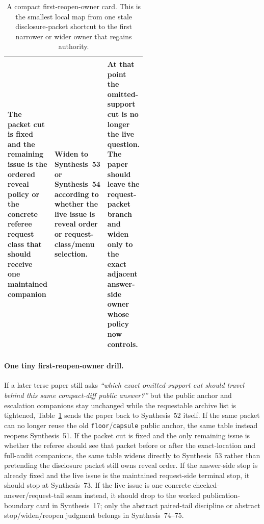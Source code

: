 \documentclass[11pt]{article}
\begin{document}
\begin{table}[t]
\begin{tabularx}{\linewidth}{@{}p{0.31\linewidth}p{0.23\linewidth}X@{}}
The packet cut is fixed and the remaining issue is the ordered reveal policy or the concrete referee request class that should receive one maintained companion & Widen to Synthesis~53 or Synthesis~54 according to whether the live issue is reveal order or request-class/menu selection. & At that point the omitted-support cut is no longer the live question. The paper should leave the request-packet branch and widen only to the exact adjacent answer-side owner whose policy now controls. \\
\bottomrule
\end{tabularx}
\caption{A compact first-reopen-owner card. This is the smallest local map from one stale disclosure-packet shortcut to the first narrower or wider owner that regains authority.}
\label{tab:first-reopen-owner-card-answer-disclosure-packet}
\end{table}

\paragraph{One tiny first-reopen-owner drill.}
If a later terse paper still asks \emph{``which exact omitted-support cut should travel behind this same compact-diff public answer?''} but the public anchor and escalation companions stay unchanged while the requestable archive list is tightened, Table~\ref{tab:first-reopen-owner-card-answer-disclosure-packet} sends the paper back to Synthesis~52 itself. If the same packet can no longer reuse the old \nolinkurl{floor}/\nolinkurl{capsule} public anchor, the same table instead reopens Synthesis~51. If the packet cut is fixed and the only remaining issue is whether the referee should see that packet before or after the exact-location and full-audit companions, the same table widens directly to Synthesis~53 rather than pretending the disclosure packet still owns reveal order. If the answer-side stop is already fixed and the live issue is the maintained request-side terminal stop, it should stop at Synthesis~73. If the live issue is one concrete checked-answer/request-tail seam instead, it should drop to the worked publication-boundary card in Synthesis~17; only the abstract paired-tail discipline or abstract stop/widen/reopen judgment belongs in Synthesis~74--75.\cite{series:workedexample,series:challengeanswerescalationladders,series:pairedterminalcitationdiscipline,series:pairedterminalcutoverrules}
\end{document}
